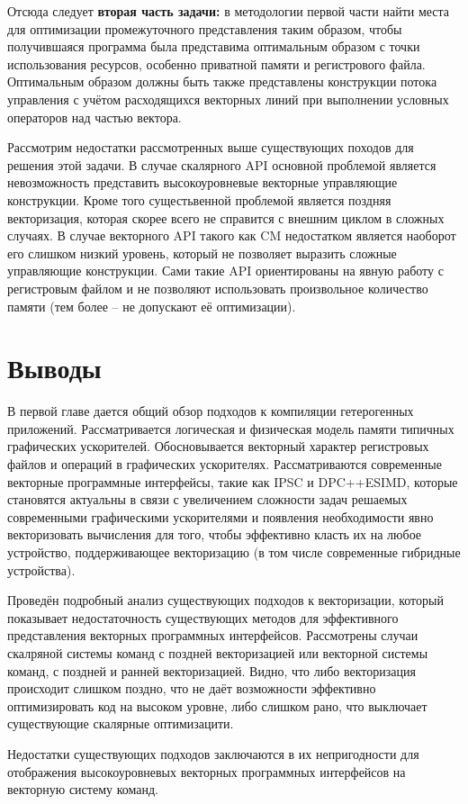 Отсюда следует \textbf{вторая часть задачи:} в методологии первой части найти места для оптимизации промежуточного представления таким образом, чтобы получившаяся программа была представима оптимальным образом с точки использования ресурсов, особенно приватной памяти и регистрового файла. Оптимальным образом должны быть также представлены конструкции потока управления с учётом расходящихся векторных линий при выполнении условных операторов над частью вектора.

Рассмотрим недостатки рассмотренных выше существующих походов для решения этой задачи. В случае скалярного API основной проблемой является невозможность представить высокоуровневые векторные управляющие конструкции. Кроме того сущестьвенной проблемой является поздняя векторизация, которая скорее всего не справится с внешним циклом в сложных случаях. В случае векторного API такого как CM недостатком является наоборот его слишком низкий уровень, который не позволяет выразить сложные управляющие конструкции. Сами такие API ориентированы на явную работу с регистровым файлом и не позволяют использовать произвольное количество памяти (тем более -- не допускают её оптимизации).

\section{Выводы}\label{sec:overview/outcome}

В первой главе дается общий обзор подходов к компиляции гетерогенных приложений. Рассматривается логическая и физическая модель памяти типичных графических ускорителей. Обосновывается векторный характер регистровых файлов и операций в графических ускорителях. Рассматриваются современные векторные программные интерфейсы, такие как IPSC и DPC++ESIMD, которые становятся актуальны в связи с увеличением сложности задач решаемых современными графическими ускорителями и появления необходимости явно векторизовать вычисления для того, чтобы эффективно класть их на любое устройство, поддерживающее векторизацию (в том числе современные гибридные устройства). 

Проведён подробный анализ существующих подходов к векторизации, который показывает недостаточность существующих методов для эффективного представления векторных программных интерфейсов. Рассмотрены случаи скалряной системы команд с поздней векторизацией или векторной системы команд, с поздней и ранней векторизацией. Видно, что либо векторизация происходит слишком поздно, что не даёт возможности эффективно оптимизировать код на высоком уровне, либо слишком рано, что выключает существующие скалярные оптимизацити.

Недостатки существующих подходов заключаются в их непригодности для отображения высокоуровневых векторных программных интерфейсов на векторную систему команд.

\FloatBarrier